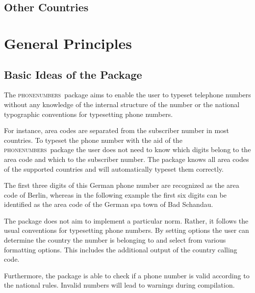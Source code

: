 \documentclass[numbers=noenddot]{scrreprt}
\newcommand*{\Paket}[1]{\textsc{#1}}
\newcommand{\phone}{\textcolor{cnltx}{\Paket{phone\-numbers}}}
\begin{document}
\section{Other Countries}
\begin{sidebyside}
\end{sidebyside}

\begin{sidebyside}
\end{sidebyside}

\chapter{General Principles}
\section{Basic Ideas of the Package}
The \phone\ package aims to enable the user to typeset telephone numbers without any knowledge of the internal structure of the number or the national typographic conventions for typesetting phone numbers.

For instance, area codes are separated from the subscriber number in most countries. To typeset the phone number with the aid of the \phone\ package the user does not need to know which digits belong to the area code and which to the subscriber number. The package knows all area codes of the supported countries and will automatically typeset them correctly.
\begin{sidebyside}
\end{sidebyside}
The first three digits of this German phone number are recognized as the area code of Berlin, whereas in the following example the first six digits can be identified as the area code of the German spa town of Bad Schandau.
\begin{sidebyside}
\end{sidebyside}

The package does not aim to implement a particular norm. Rather, it follows the usual conventions for typesetting phone numbers. By setting options the user can determine the country the number is belonging to and select from various formatting options. This includes the additional output of the country calling code.

Furthermore, the package is able to check if a phone number is valid according to the national rules. Invalid numbers will lead to warnings during compilation.
\end{document}
